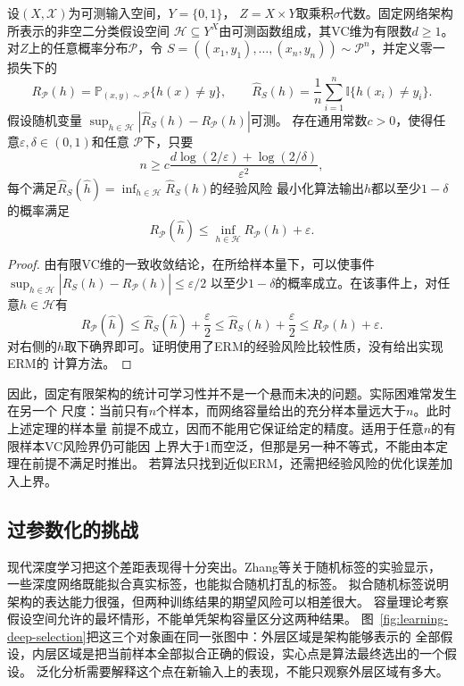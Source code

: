 \begin{theorem}[有限VC维网络的不可知PAC样本量保证]
\label{thm:network-vc-pac}
设$(X,\mathcal X)$为可测输入空间，$Y=\{0,1\}$，
$Z=X\times Y$取乘积$\sigma$代数。固定网络架构所表示的非空二分类假设空间
$\mathcal H\subseteq Y^X$由可测函数组成，其VC维为有限数$d\geq1$。
对$Z$上的任意概率分布$\mathcal P$，令
$S=((x_1,y_1),\ldots,(x_n,y_n))\sim\mathcal P^n$，并定义零一损失下的
\[
 R_{\mathcal P}(h)=\mathbb P_{(x,y)\sim\mathcal P}\{h(x)\neq y\},
 \qquad
 \hat R_S(h)=\frac1n\sum_{i=1}^n\mathbb I\{h(x_i)\neq y_i\}.
\]
假设随机变量
$\sup_{h\in\mathcal H}|\hat R_S(h)-R_{\mathcal P}(h)|$可测。
存在通用常数$c>0$，使得任意$\varepsilon,\delta\in(0,1)$和任意
$\mathcal P$下，只要
\[
 n\geq c\frac{d\log(2/\varepsilon)+\log(2/\delta)}{\varepsilon^2},
\]
每个满足$\hat R_S(\hat h)=\inf_{h\in\mathcal H}\hat R_S(h)$的经验风险
最小化算法输出$\hat h$都以至少$1-\delta$的概率满足
\[
 R_{\mathcal P}(\hat h)\leq\inf_{h\in\mathcal H}R_{\mathcal P}(h)+\varepsilon.
\]
\end{theorem}
\begin{proof}
由有限VC维的一致收敛结论，在所给样本量下，可以使事件
$\sup_{h\in\mathcal H}|\hat R_S(h)-R_{\mathcal P}(h)|\leq\varepsilon/2$
以至少$1-\delta$的概率成立。在该事件上，对任意$h\in\mathcal H$有
\[
 R_{\mathcal P}(\hat h)
 \leq\hat R_S(\hat h)+\frac\varepsilon2
 \leq\hat R_S(h)+\frac\varepsilon2
 \leq R_{\mathcal P}(h)+\varepsilon.
\]
对右侧的$h$取下确界即可。证明使用了ERM的经验风险比较性质，没有给出实现ERM的
计算方法。
\end{proof}

因此，固定有限架构的统计可学习性并不是一个悬而未决的问题。实际困难常发生在另一个
尺度：当前只有$n$个样本，而网络容量给出的充分样本量远大于$n$。此时上述定理的样本量
前提不成立，因而不能用它保证给定的精度。适用于任意$n$的有限样本VC风险界仍可能因
上界大于1而空泛，但那是另一种不等式，不能由本定理在前提不满足时推出。
若算法只找到近似ERM，还需把经验风险的优化误差加入上界。

\subsection{过参数化的挑战}

现代深度学习把这个差距表现得十分突出。Zhang等关于随机标签的实验显示，
一些深度网络既能拟合真实标签，也能拟合随机打乱的标签。
拟合随机标签说明架构的表达能力很强，但两种训练结果的期望风险可以相差很大。
容量理论考察假设空间允许的最坏情形，不能单凭架构容量区分这两种结果。
图~\ref{fig:learning-deep-selection}把这三个对象画在同一张图中：外层区域是架构能够表示的
全部假设，内层区域是把当前样本全部拟合正确的假设，实心点是算法最终选出的一个假设。
泛化分析需要解释这个点在新输入上的表现，不能只观察外层区域有多大。

